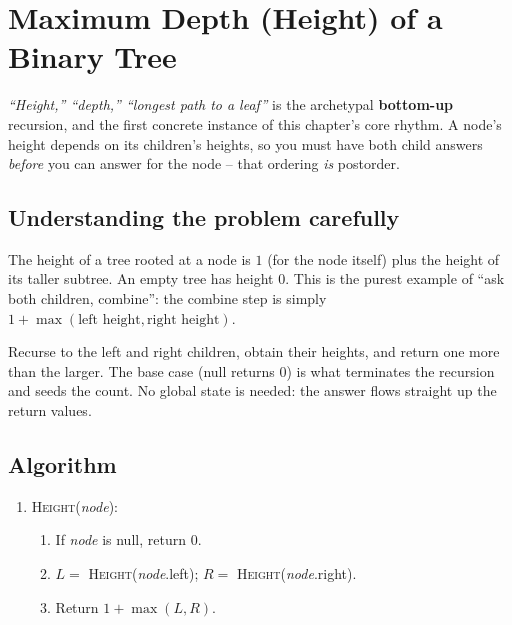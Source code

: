 \section{Maximum Depth (Height) of a Binary Tree}
\label{sec:trees-max-depth}


\begin{patternbox}
\emph{``Height,'' ``depth,'' ``longest path to a leaf''} is the archetypal
\textbf{bottom-up} recursion, and the first concrete instance of this
chapter's core rhythm. A node's height depends on its children's heights,
so you must have both child answers \emph{before} you can answer for the
node -- that ordering \emph{is} postorder.
\end{patternbox}

\subsection*{Understanding the problem carefully}

The height of a tree rooted at a node is $1$ (for the node itself) plus
the height of its taller subtree. An empty tree has height $0$. This is
the purest example of ``ask both children, combine'': the combine step is
simply $1+\max(\text{left height}, \text{right height})$.

\begin{ideabox}[Height = 1 + max of the Two Child Heights]
Recurse to the left and right children, obtain their heights, and return
one more than the larger. The base case (null returns $0$) is what
terminates the recursion and seeds the count. No global state is needed:
the answer flows straight up the return values.
\end{ideabox}

\subsection*{Algorithm}

\begin{enumerate}
  \item \textsc{Height}(\textit{node}):
  \begin{enumerate}
    \item If \textit{node} is null, return $0$.
    \item $L = $ \textsc{Height}(\textit{node}.left); $R = $
          \textsc{Height}(\textit{node}.right).
    \item Return $1 + \max(L, R)$.
  \end{enumerate}
\end{enumerate}

